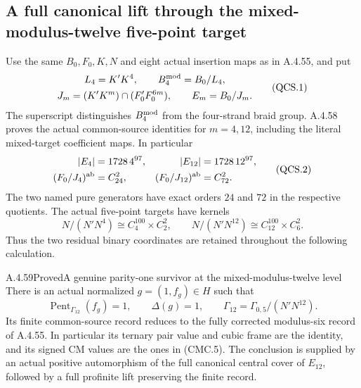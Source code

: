 \subsection{A full canonical lift through the mixed-modulus-twelve five-point target}

Use the same $B_0,F_0,K,N$ and eight actual insertion maps as in
A.4.55, and put
\[
 \begin{gathered}
 L_4=K'K^4,\qquad B_4^{\rm mod}=B_0/L_4,\\
 J_m=(K'K^m)\cap(F_0'F_0^{6m}),\qquad E_m=B_0/J_m.
 \end{gathered}
 \tag{QCS.1}
\]
The superscript distinguishes $B_4^{\rm mod}$ from the four-strand
braid group.  A.4.58 proves the actual common-source identities for
$m=4,12$, including the literal mixed-target coefficient maps.  In
particular
\[
 \begin{aligned}
 |E_4|&=1728\,4^{97},&
 |E_{12}|&=1728\,12^{97},\\
 (F_0/J_4)^{\rm ab}&=C_{24}^{2},&
 (F_0/J_{12})^{\rm ab}&=C_{72}^{2}.
 \end{aligned}
 \tag{QCS.2}
\]
The two named pure generators have exact orders $24$ and $72$ in
the respective quotients.  The actual five-point targets have kernels
\[
 N/(N'N^4)\cong C_4^{100}\times C_2^2,\qquad
 N/(N'N^{12})\cong C_{12}^{100}\times C_6^2.
 \tag{QCS.3}
\]
Thus the two residual binary coordinates are retained throughout the
following calculation.

\begin{result}{A.4.59}{Proved}{A genuine parity-one survivor at the mixed-modulus-twelve level}
There is an actual normalized $g=(1,f_g)\in H$ such that
\[
 \operatorname{Pent}_{\Gamma_{12}}(f_g)=1,
 \qquad \Delta(g)=1,
 \qquad \Gamma_{12}=\Gamma_{0,5}/(N'N^{12}).
 \tag{QCS.4}
\]
Its finite common-source record reduces to the fully corrected
modulus-six record of A.4.55.  In particular its ternary pair value
and cubic frame are the identity, and its signed CM values are the
ones in (CMC.5).  The conclusion is supplied by an actual positive
automorphism of the full canonical central cover of $E_{12}$,
followed by a full profinite lift preserving the finite record.
\end{result}

